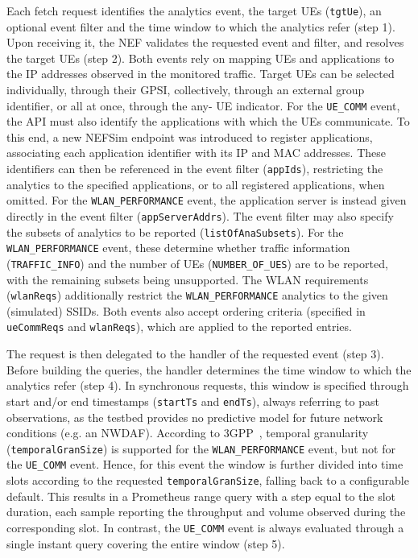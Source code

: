 Each fetch request identifies the analytics event, the target \acsp{UE} (\texttt{tgtUe}), an optional event filter and the time window to which the analytics refer (step 1). Upon receiving it, the \acs{NEF} validates the requested event and filter, and resolves the target \acsp{UE} (step 2). Both events rely on mapping \acsp{UE} and applications to the \acs{IP} addresses observed in the monitored traffic. Target \acsp{UE} can be selected individually, through their \acs{GPSI}, collectively, through an external group identifier, or all at once, through the any- \acs{UE} indicator. For the \texttt{UE\_COMM} event, the \acs{API} must also identify the applications with which the \acsp{UE} communicate. To this end, a new \acs{NEF}Sim endpoint was introduced to register applications, associating each application identifier with its \acs{IP} and \acs{MAC} addresses. These identifiers can then be referenced in the event filter (\texttt{appIds}), restricting the analytics to the specified applications, or to all registered applications, when omitted. For the \texttt{WLAN\_PERFORMANCE} event, the application server is instead given directly in the event filter (\texttt{appServerAddrs}). The event filter may also specify the subsets of analytics to be reported (\texttt{listOfAnaSubsets}). For the \texttt{WLAN\_PERFORMANCE} event, these determine whether traffic information (\texttt{TRAFFIC\_INFO}) and the number of \acsp{UE} (\texttt{NUMBER\_OF\_UES}) are to be reported, with the remaining subsets being unsupported. The \acs{WLAN} requirements (\texttt{wlanReqs}) additionally restrict the \texttt{WLAN\_PERFORMANCE} analytics to the given (simulated) \acsp{SSID}. Both events also accept ordering criteria (specified in \texttt{ueCommReqs} and \texttt{wlanReqs}), which are applied to the reported entries.

The request is then delegated to the handler of the requested event (step 3). Before building the queries, the handler determines the time window to which the analytics refer (step 4). In synchronous requests, this window is specified through start and/or end timestamps (\texttt{startTs} and \texttt{endTs}), always referring to past observations, as the testbed provides no predictive model for future network conditions (e.g. an \acs{NWDAF}). According to \acs{3GPP}~\cite{ETSI_TS_129_520_V18_6_0}, temporal granularity (\texttt{temporalGranSize}) is supported for the \texttt{WLAN\_\allowbreak PERFORMANCE} event, but not for the \texttt{UE\_\allowbreak COMM} event. Hence, for this event the window is further divided into time slots according to the requested \texttt{temporalGranSize}, falling back to a configurable default. This results in a Prometheus range query with a step equal to the slot duration, each sample reporting the throughput and volume observed during the corresponding slot. In contrast, the \texttt{UE\_COMM} event is always evaluated through a single instant query covering the entire window (step 5).

